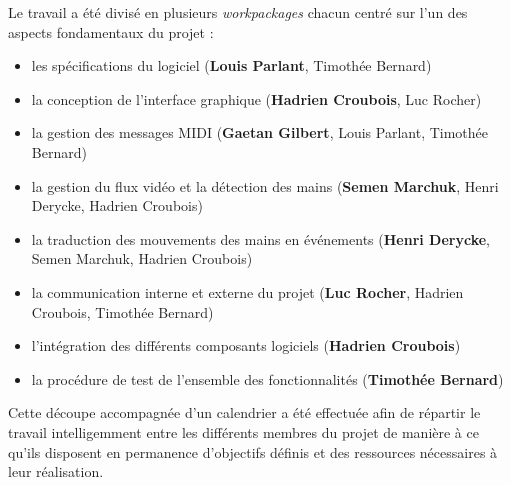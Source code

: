 \par Le travail a été divisé en plusieurs \emph{workpackages} chacun centré sur l'un des aspects fondamentaux du projet :
\begin{itemize}
    \item les spécifications du logiciel (\textbf{Louis Parlant}, Timothée Bernard)
    \item la conception de l'interface graphique (\textbf{Hadrien Croubois}, Luc Rocher)
    \item la gestion des messages MIDI (\textbf{Gaetan Gilbert}, Louis Parlant, Timothée Bernard)
    \item la gestion du flux vidéo et la détection des mains (\textbf{Semen Marchuk}, Henri Derycke, Hadrien Croubois)
    \item la traduction des mouvements des mains en événements (\textbf{Henri Derycke}, Semen Marchuk, Hadrien Croubois)
    \item la communication interne et externe du projet (\textbf{Luc Rocher}, Hadrien Croubois, Timothée Bernard)
    \item l'intégration des différents composants logiciels (\textbf{Hadrien Croubois})
    \item la procédure de test de l'ensemble des fonctionnalités (\textbf{Timothée Bernard})
\end{itemize}
\par Cette découpe accompagnée d'un calendrier a été effectuée afin de répartir le travail intelligemment entre les différents membres du projet de manière à ce qu'ils disposent en permanence d'objectifs définis et des ressources nécessaires à leur réalisation.
